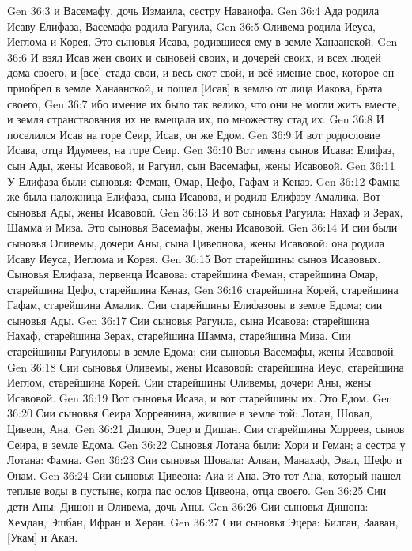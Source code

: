 \vs Gen 36:3 и Васемафу, дочь Измаила, сестру Наваиофа.
\vs Gen 36:4 Ада родила Исаву Елифаза, Васемафа родила Рагуила,
\vs Gen 36:5 Оливема родила Иеуса, Иеглома и Корея. Это сыновья Исава, родившиеся ему в земле Ханаанской.
\vs Gen 36:6 И взял Исав жен своих и сыновей своих, и дочерей своих, и всех людей дома своего, и [все] стада свои, и весь скот свой, и всё имение свое, которое он приобрел в земле Ханаанской, и пошел [Исав] в  землю от лица Иакова, брата своего,
\vs Gen 36:7 ибо имение их было так велико, что они не могли жить вместе, и земля странствования их не вмещала их, по множеству стад их.
\vs Gen 36:8 И поселился Исав на горе Сеир, Исав, он же Едом.
\rsbpar\vs Gen 36:9 И вот родословие Исава, отца Идумеев, на горе Сеир.
\vs Gen 36:10 Вот имена сынов Исава: Елифаз, сын Ады, жены Исавовой, и Рагуил, сын Васемафы, жены Исавовой.
\vs Gen 36:11 У Елифаза были сыновья: Феман, Омар, Цефо, Гафам и Кеназ.
\vs Gen 36:12 Фамна же была наложница Елифаза, сына Исавова, и родила Елифазу Амалика. Вот сыновья Ады, жены Исавовой.
\vs Gen 36:13 И вот сыновья Рагуила: Нахаф и Зерах, Шамма и Миза. Это сыновья Васемафы, жены Исавовой.
\vs Gen 36:14 И сии были сыновья Оливемы, дочери Аны, сына Цивеонова, жены Исавовой: она родила Исаву Иеуса, Иеглома и Корея.
\vs Gen 36:15 Вот старейшины сынов Исавовых. Сыновья Елифаза, первенца Исавова: старейшина Феман, старейшина Омар, старейшина Цефо, старейшина Кеназ,
\vs Gen 36:16 старейшина Корей, старейшина Гафам, старейшина Амалик. Сии старейшины Елифазовы в земле Едома; сии сыновья Ады.
\vs Gen 36:17 Сии сыновья Рагуила, сына Исавова: старейшина Нахаф, старейшина Зерах, старейшина Шамма, старейшина Миза. Сии старейшины Рагуиловы в земле Едома; сии сыновья Васемафы, жены Исавовой.
\vs Gen 36:18 Сии сыновья Оливемы, жены Исавовой: старейшина Иеус, старейшина Иеглом, старейшина Корей. Сии старейшины Оливемы, дочери Аны, жены Исавовой.
\vs Gen 36:19 Вот сыновья Исава, и вот старейшины их. Это Едом.
\rsbpar\vs Gen 36:20 Сии сыновья Сеира Хорреянина, жившие в земле той: Лотан, Шовал, Цивеон, Ана,
\vs Gen 36:21 Дишон, Эцер и Дишан. Сии старейшины Хорреев, сынов Сеира, в земле Едома.
\vs Gen 36:22 Сыновья Лотана были: Хори и Геман; а сестра у Лотана: Фамна.
\vs Gen 36:23 Сии сыновья Шовала: Алван, Манахаф, Эвал, Шефо и Онам.
\vs Gen 36:24 Сии сыновья Цивеона: Аиа и Ана. Это тот Ана, который нашел теплые воды в пустыне, когда пас ослов Цивеона, отца своего.
\vs Gen 36:25 Сии дети Аны: Дишон и Оливема, дочь Аны.
\vs Gen 36:26 Сии сыновья Дишона: Хемдан, Эшбан, Ифран и Херан.
\vs Gen 36:27 Сии сыновья Эцера: Билган, Зааван, [Укам] и Акан.
